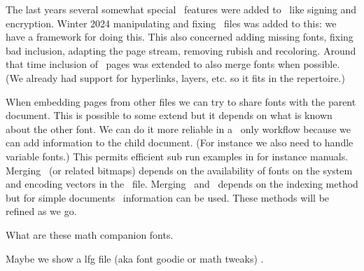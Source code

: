 \stoptitle

\starttitle[title=Messing with \PDF\ files ]

\startitemize
\startitem
    The last years several somewhat special \PDF\ features were added to
    \CONTEXT\ like signing and encryption.
\stopitem
\startitem
    Winter 2024 manipulating and fixing \PDF\ files was added to this: we have a
    framework for doing this.
\stopitem
\startitem
    This also concerned adding missing fonts, fixing bad inclusion, adapting the
    page stream, removing rubish and recoloring.
\stopitem
\startitem
    Around that time inclusion of \PDF\ pages was extended to also merge fonts
    when possible. (We already had support for hyperlinks, layers, etc. so it
    fits in the repertoire.)
\stopitem
\stopitemize

\starttitle[title=Merging fonts]

\startitemize
\startitem
    When embedding pages from other files we can try to share fonts with the parent document.
\stopitem
\startitem
    This is possible to some extend but it depends on what is known about the other font.
\stopitem
\startitem
    We can do it more reliable in a \CONTEXT\ only workflow because we can add information
    to the child document. (For instance we also need to handle variable fonts.)
\stopitem
\startitem
    This permits efficient sub run examples in for instance manuals.
\stopitem
\startitem
    Merging \TYPEONE\ (or related bitmaps) depends on the availability of fonts
    on the system and encoding vectors in the \PDF\ file.
\stopitem
\startitem
    Merging \OPENTYPE\ and \TRUETYPE\ depends on the indexing method but for
    simple documents \UNICODE\ information can be used.
\stopitem
\startitem
    These methods will be refined as we go.
\stopitem
\stopitemize

\stoptitle

\stoptitle

\starttitle[title=Goodie files]

What are these math companion fonts.

Maybe we show a lfg file (aka font goodie or math tweaks) .

\stoptitle




\stopdocument
